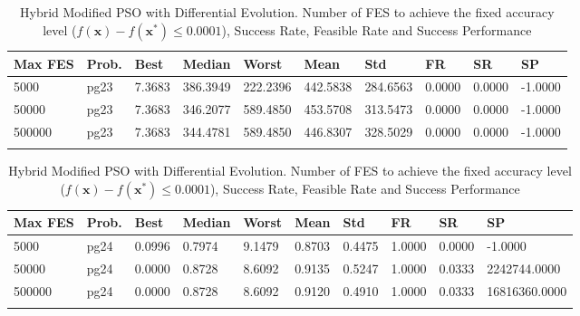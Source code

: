 \documentclass[10pt, a4paper]{book}
\begin{document}
\begin{center}
\begin{longtable}{l l l l l l l l l l}
\textbf{Max FES} & \textbf{Prob.} & \textbf{Best} & \textbf{Median} & \textbf{Worst} & \textbf{Mean} & \textbf{Std} & \textbf{FR} & \textbf{SR} & \textbf{SP} \\
\hline
5000 & pg23 & 7.3683 & 386.3949 & 222.2396 & 442.5838 & 284.6563 & 0.0000 & 0.0000 & -1.0000 \\
50000 & pg23 & 7.3683 & 346.2077 & 589.4850 & 453.5708 & 313.5473 & 0.0000 & 0.0000 & -1.0000 \\
500000 & pg23 & 7.3683 & 344.4781 & 589.4850 & 446.8307 & 328.5029 & 0.0000 & 0.0000 & -1.0000 \\

\caption{ Hybrid Modified PSO with Differential Evolution. Number of FES to achieve the fixed accuracy level ($f(\mathbf{x}) - f(\mathbf{x}^{*}) \leq 0.0001$), Success Rate, Feasible Rate and Success Performance }
\end{longtable}
\end{center}

\begin{center}
\begin{longtable}{l l l l l l l l l l}
\textbf{Max FES} & \textbf{Prob.} & \textbf{Best} & \textbf{Median} & \textbf{Worst} & \textbf{Mean} & \textbf{Std} & \textbf{FR} & \textbf{SR} & \textbf{SP} \\
\hline
5000 & pg24 & 0.0996 & 0.7974 & 9.1479 & 0.8703 & 0.4475 & 1.0000 & 0.0000 & -1.0000 \\
50000 & pg24 & 0.0000 & 0.8728 & 8.6092 & 0.9135 & 0.5247 & 1.0000 & 0.0333 & 2242744.0000 \\
500000 & pg24 & 0.0000 & 0.8728 & 8.6092 & 0.9120 & 0.4910 & 1.0000 & 0.0333 & 16816360.0000 \\

\caption{ Hybrid Modified PSO with Differential Evolution. Number of FES to achieve the fixed accuracy level ($f(\mathbf{x}) - f(\mathbf{x}^{*}) \leq 0.0001$), Success Rate, Feasible Rate and Success Performance }
\end{longtable}
\end{center}
\end{document}
